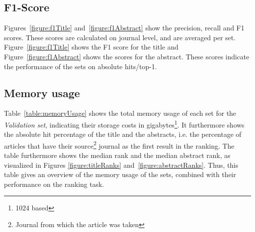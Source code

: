 \documentclass[runningheads]{llncs}
\begin{document}
\subsection{F1-Score}
Figures~\ref{figure:f1Title} and~\ref{figure:f1Abstract} show the precision, recall and F1 scores. These scores are calculated on journal level, and are averaged per set. Figure~\ref{figure:f1Title} shows the F1 score for the title and Figure~\ref{figure:f1Abstract} shows the scores for the abstract. These scores indicate the performance of the sets on absolute hits/top-1.
\subsection{Memory usage}
Table~\ref{table:memoryUsage} shows the total memory usage of each set for the \textit{Validation set}, indicating their storage costs in gigabytes\footnote{1024 based}. It furthermore shows the absolute hit percentage of the title and the abstracts, i.e. the percentage of articles that have their source\footnote{Journal from which the article was taken} journal as the first result in the ranking. The table furthermore shows the median rank and the median abstract rank, as visualized in Figures \ref{figure:titleRanks} and~\ref{figure:abstractRanks}. Thus, this table gives an overview of the memory usage of the sets, combined with their performance on the ranking task.
\end{document}
